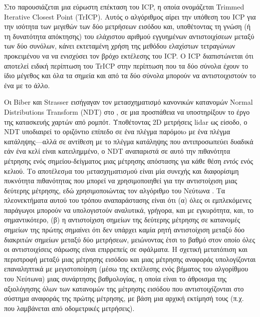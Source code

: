Στο \cite{Chetverikova} παρουσιάζεται μια εύρωστη επέκταση του ICP, η οποία
ονομάζεται Trimmed Iterative Closest Point (TrICP). Αυτός ο αλγόριθμος αίρει
την υπόθεση του ICP για την ισότητα των μεγεθών των δύο μετρήσεων εισόδου και,
υποθέτοντας τη γνώση (ή τη δυνατότητα απόκτησης) του ελάχιστου αριθμού
εγγυημένων αντιστοιχίσεων μεταξύ των δύο συνόλων, κάνει εκτεταμένη χρήση της
μεθόδου ελαχίστων τετραγώνων \cite{Rousseeuw1984} προκειμένου να να ενισχύσει
τον βρόχο εκτέλεσης του ICP.  Ο ICP διαπιστώνεται ότι αποτελεί ειδική περίπτωση
του TrICP στην περίπτωση που τα δύο σύνολα έχουν το ίδιο μέγεθος και όλα τα
σημεία και από τα δύο σύνολα μπορούν να αντιστοιχιστούν το ένα με το άλλο.

Οι Biber και Strasser εισήγαγαν τον μετασχηματισμό κανονικών κατανομών Normal
Distributions Transform (NDT) στο \cite{Bibera}, σε μια προσπάθεια να
υποστηρίξουν το έργο της κατασκευής χαρτών από ρομπότ. Υποθέτοντας 2D μετρήσεις
lidar ως είσοδο, ο NDT υποδιαιρεί το οριζόντιο επίπεδο σε ένα πλέγμα παρόμοιo
με ένα πλέγμα κατάληψης---αλλά σε αντίθεση με το πλέγμα κατάληψης που
αντιπροσωπεύει δυαδικά εάν ένα κελί είναι κατειλημμένο, ο NDT αναπαριστά
σε αυτό την πιθανότητα μέτρησης ενός σημείου-δείγματος μιας μέτρησης απόστασης
για κάθε θέση \textit{εντός} ενός κελιού. Το αποτέλεσµα του µετασχηµατισµού
είναι μία συνεχής και διαφορίσιμη πυκνότητα πιθανότητας που μπορεί να
χρησιμοποιηθεί για την αντιστοίχιση μιας δεύτερης μέτρησης, εδώ χρησιμοποιώντας
τον αλγόριθμο του Νεύτωνα \cite{Suli2003}. Τα πλεονεκτήματα αυτού του τρόπου
αναπαράστασης είναι ότι (α) όλες οι εμπλεκόμενες παράγωγοι μπορούν να
υπολογιστούν αναλυτικά, γρήγορα, και με εγκυρότητα, και, το σημαντικότερο, (β)
η αντιστοίχιση σημείων της δεύτερης μέτρησης σε κατανομές σημείων της πρώτης
σημαίνει ότι δεν υπάρχει καμία ρητή αντιστοίχιση μεταξύ δύο διακριτών σημείων
μεταξύ δύο μετρήσεων, μειώνοντας έτσι το βαθμό στον οποίο όλες οι
αντιστοιχίσεις σάρωσης είναι επιρρεπείς σε σφάλματα. Η σχετική μετατόπιση και
περιστροφή μεταξύ μιας μέτρησης εισόδου και μιας μέτρησης αναφοράς
υπολογίζονται επαναληπτικά με μεγιστοποίηση (μέσω της εκτέλεσης ενός βήματος
του αλγορίθμου του Νεύτωνα) μιας συνάρτησης βαθμολογίας, η οποία είναι το
άθροισμα της αξιολόγησης όλων των κατανομών της μέτρησης εισόδου που
αντιστοιχίζονται στο σύστημα αναφοράς της πρώτης μέτρησης, με βάση μια αρχική
εκτίμησή τους (π.χ. που λαμβάνεται από οδομετρικές μετρήσεις).

